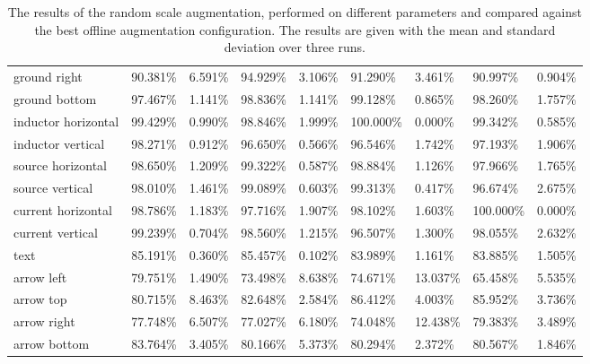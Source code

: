 \begin{table}[H]
\begin{center}
\begin{tabular}{|l|l|l|l|l|l|l|l|l|}
\rowcolor{lightgray!50}
ground right                    & 90.381\% & 6.591\% & 94.929\% & 3.106\% & 91.290\%   & 3.461\%   & 90.997\%  & 0.904\%   \\
ground bottom                   & 97.467\% & 1.141\% & 98.836\% & 1.141\% & 99.128\%   & 0.865\%   & 98.260\%  & 1.757\%   \\
\rowcolor{lightgray!50}
inductor horizontal             & 99.429\% & 0.990\% & 98.846\% & 1.999\% & 100.000\%  & 0.000\%   & 99.342\%  & 0.585\%   \\
inductor vertical               & 98.271\% & 0.912\% & 96.650\% & 0.566\% & 96.546\%   & 1.742\%   & 97.193\%  & 1.906\%   \\
\rowcolor{lightgray!50}
source horizontal               & 98.650\% & 1.209\% & 99.322\% & 0.587\% & 98.884\%   & 1.126\%   & 97.966\%  & 1.765\%   \\
source vertical                 & 98.010\% & 1.461\% & 99.089\% & 0.603\% & 99.313\%   & 0.417\%   & 96.674\%  & 2.675\%   \\
\rowcolor{lightgray!50}
current horizontal              & 98.786\% & 1.183\% & 97.716\% & 1.907\% & 98.102\%   & 1.603\%   & 100.000\% & 0.000\%   \\
current vertical                & 99.239\% & 0.704\% & 98.560\% & 1.215\% & 96.507\%   & 1.300\%   & 98.055\%  & 2.632\%   \\
\rowcolor{lightgray!50}
text                            & 85.191\% & 0.360\% & 85.457\% & 0.102\% & 83.989\%   & 1.161\%   & 83.885\%  & 1.505\%   \\
arrow left                      & 79.751\% & 1.490\% & 73.498\% & 8.638\% & 74.671\%   & 13.037\%  & 65.458\%  & 5.535\%   \\
\rowcolor{lightgray!50}
arrow top                       & 80.715\% & 8.463\% & 82.648\% & 2.584\% & 86.412\%   & 4.003\%   & 85.952\%  & 3.736\%   \\
arrow right                     & 77.748\% & 6.507\% & 77.027\% & 6.180\% & 74.048\%   & 12.438\%  & 79.383\%  & 3.489\%   \\
\rowcolor{lightgray!50}
arrow bottom                    & 83.764\% & 3.405\% & 80.166\% & 5.373\% & 80.294\%   & 2.372\%   & 80.567\%  & 1.846\%   \\
\hline

\end{tabular}
\caption{The results of the random scale augmentation, performed on different parameters and compared against the best offline augmentation configuration. The results are given with the mean and standard deviation over three runs.}
\label{tab:yolo_random_scale_augmentation_result}
\end{center}
\end{table}

